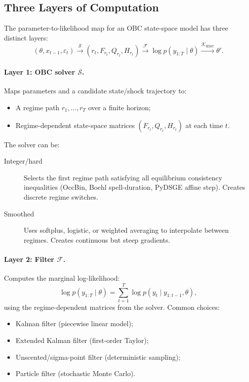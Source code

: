 \subsection{Three Layers of Computation}

The parameter-to-likelihood map for an OBC state-space model has three
distinct layers:
\begin{equation}
  (\theta, x_{t-1}, \varepsilon_t)
  \xrightarrow{\mathcal{S}} (r_t, F_{r_t}, Q_{r_t}, H_{r_t})
  \xrightarrow{\mathcal{F}} \log p(y_{1:T} \mid \theta)
  \xrightarrow{\mathcal{K}_{\text{HMC}}} \theta'.
  \label{eq:obc-three-layers}
\end{equation}

\paragraph{Layer 1: OBC solver $\mathcal{S}$.}
Maps parameters and a candidate state/shock trajectory to:
\begin{itemize}
  \item A regime path $r_1, \ldots, r_T$ over a finite horizon;
  \item Regime-dependent state-space matrices $(F_{r_t}, Q_{r_t}, H_{r_t})$ at
    each time $t$.
\end{itemize}
The solver can be:
\begin{description}
  \item[Integer/hard] Selects the first regime path satisfying all equilibrium
    consistency inequalities (OccBin, Boehl spell-duration, PyDSGE affine
    step). Creates discrete regime switches.
  \item[Smoothed] Uses softplus, logistic, or weighted averaging to
    interpolate between regimes. Creates continuous but steep gradients.
\end{description}

\paragraph{Layer 2: Filter $\mathcal{F}$.}
Computes the marginal log-likelihood:
\begin{equation}
  \log p(y_{1:T} \mid \theta)
  = \sum_{t=1}^T \log p(y_t \mid y_{1:t-1}, \theta),
\end{equation}
using the regime-dependent matrices from the solver. Common choices:
\begin{itemize}
  \item Kalman filter (piecewise linear model);
  \item Extended Kalman filter (first-order Taylor);
  \item Unscented/sigma-point filter (deterministic sampling);
  \item Particle filter (stochastic Monte Carlo).
\end{itemize}

